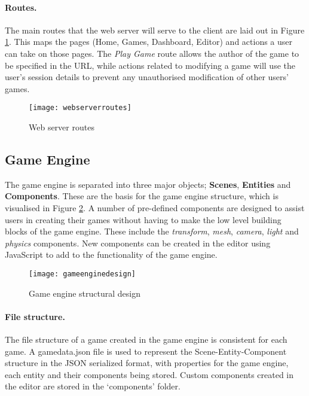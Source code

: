 
	\paragraph{Routes.}
	The main routes that the web server will serve to the client are laid out in Figure \ref{fig:webserverroutes}. This maps the pages (Home, Games, Dashboard, Editor) and actions a user can take on those pages. The \emph{Play Game} route allows the author of the game to be specified in the URL, while actions related to modifying a game will use the user's session details to prevent any unauthorised modification of other users' games.

	\begin{figure}[h]
		\centering
		\texttt{[image: webserverroutes]}
		\caption{Web server routes}
		\label{fig:webserverroutes}
	\end{figure}

	\subsection{Game Engine}
	The game engine is separated into three major objects; \textbf{Scenes}, \textbf{Entities} and \textbf{Components}. These are the basis for the game engine structure, which is visualised in Figure \ref{fig:gameenginedesign}. A number of pre-defined components are designed to assist users in creating their games without having to make the low level building blocks of the game engine. These include the \emph{transform}, \emph{mesh}, \emph{camera}, \emph{light} and \emph{physics} components. New components can be created in the editor using JavaScript to add to the functionality of the game engine.


	\begin{figure}[h]
		\centering
		\texttt{[image: gameenginedesign]}
		\caption{Game engine structural design}
		\label{fig:gameenginedesign}
	\end{figure}

	\paragraph{File structure.}
	The file structure of a game created in the game engine is consistent for each game. A gamedata.json file is used to represent the Scene-Entity-Component structure in the JSON serialized format, with properties for the game engine, each entity and their components being stored. Custom components created in the editor are stored in the `components' folder.

